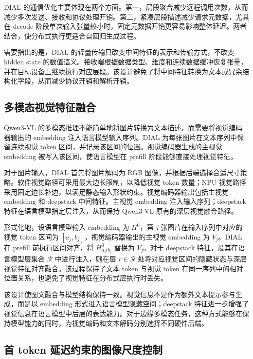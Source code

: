 \documentclass[10pt,a4paper,twocolumn]{ctexart}
\begin{document}
DIAL 的通信优化主要体现在两个方面。第一，层段聚合减少远程调用次数，从而减少多次发送、接收和协议处理开销。第二，紧凑层段描述减少请求元数据，尤其在 decode 阶段单次输入张量较小时，固定元数据开销更容易影响整体延迟。两者结合，使分布式执行更适合自回归生成过程。

需要指出的是，DIAL 的轻量传输只改变中间特征的表示和传输方式，不改变 hidden state 的数值语义。接收端根据数据类型、维度和连续数据缓冲恢复张量，并在目标设备上继续执行对应层段。该设计避免了将中间特征转换为文本或冗余结构化字段，从而减少协议开销和解析开销。

\subsection{多模态视觉特征融合}

Qwen3-VL 的多模态推理不能简单地将图片转换为文本描述，而需要将视觉编码器输出的 embedding 注入语言模型输入序列。DIAL 为每张图片在文本序列中保留连续视觉 token 区间，并记录该区间的位置。视觉编码器生成的主视觉 embedding 被写入该区间，使语言模型在 prefill 阶段能够直接处理视觉特征。

对于图片输入，DIAL 首先将图片解码为 RGB 图像，并根据后端选择合适尺寸策略。软件视觉路径可采用最大边长限制，以降低视觉 token 数量；NPU 视觉路径采用固定边长补边，以满足静态输入形状约束。视觉编码器输出包括主视觉 embedding 和 deepstack 中间特征。主视觉 embedding 注入输入序列；deepstack 特征在语言模型指定层注入，从而保持 Qwen3-VL 原有的深层视觉融合路径。

形式化地，设语言模型输入 embedding 为 \(H^0\)，第 \(j\) 张图片在输入序列中对应的视觉 token 区间为 \([a_j,b_j]\)，视觉编码器输出的主视觉 embedding 为 \(V_j\)。DIAL 在 prefill 前执行区间对齐，将 \(H^0_{a_j:b_j}\) 替换为 \(V_j\)。对于 deepstack 特征，设其在语言模型层集合 \(\mathcal{R}\) 中进行注入，则在层 \(r\in\mathcal{R}\) 处将对应视觉区间的隐藏状态与深层视觉特征对齐融合。该过程保持了文本 token 与视觉 token 在同一序列中的相对位置关系，也避免了视觉特征在分布式层执行时丢失。

该设计使图文融合与模型结构保持一致。视觉信息不是作为额外文本提示参与生成，而是以 embedding 形式进入语言模型隐藏空间；deepstack 特征进一步增强了视觉信息在语言模型中后层的表达能力。对于边缘多模态任务，这种方式能够在保持模型能力的同时，为视觉编码和文本解码分别选择不同硬件后端。

\subsection{首 token 延迟约束的图像尺度控制}
\end{document}
